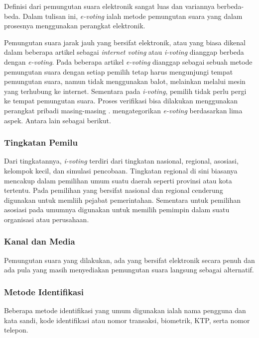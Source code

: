 \documentclass[12pt, a4paper, final]{article}
\begin{document}
Definisi dari pemungutan suara elektronik sangat luas dan variannya berbeda-beda. Dalam tulisan ini, \textit{e-voting} ialah metode pemungutan suara yang dalam prosesnya menggunakan perangkat elektronik.

Pemungutan suara jarak jauh yang bersifat elektronik, atau yang biasa dikenal dalam beberapa artikel sebagai \textit{internet voting} atau \textit{i-voting} dianggap berbeda dengan \textit{e-voting}. Pada beberapa artikel \textit{e-voting} dianggap sebagai sebuah metode pemungutan suara dengan setiap pemilih tetap harus mengunjungi tempat pemungutan suara, namun tidak menggunakan balot, melainkan melalui mesin yang terhubung ke internet. Sementara pada \textit{i-voting}, pemilih tidak perlu pergi ke tempat pemungutan suara. Proses verifikasi bisa dilakukan menggunakan perangkat pribadi masing-masing \cite{8651451}. \cite{review1} mengategorikan \textit{e-voting} berdasarkan lima aspek. Antara lain sebagai berikut.

\subsubsection{Tingkatan Pemilu}

Dari tingkatannya, \textit{i-voting} terdiri dari tingkatan nasional, regional, asosiasi, kelompok kecil, dan simulasi pencobaan. Tingkatan regional di sini biasanya mencakup dalam pemilihan umum suatu daerah seperti provinsi atau kota tertentu. Pada pemilihan yang bersifat nasional dan regional cenderung digunakan untuk memliih pejabat pemerintahan. Sementara untuk pemilihan asosiasi pada umumnya digunakan untuk memilih pemimpin dalam suatu organisasi atau perusahaan.

\subsubsection{Kanal dan Media}

Pemungutan suara yang dilakukan, ada yang bersifat elektronik secara penuh dan ada pula yang masih menyediakan pemungutan suara langsung sebagai alternatif.

\subsubsection{Metode Identifikasi}

Beberapa metode identifikasi yang umum digunakan ialah nama pengguna dan kata sandi, kode identifikasi atau nomor transaksi, biometrik, KTP, serta nomor telepon.
\end{document}
